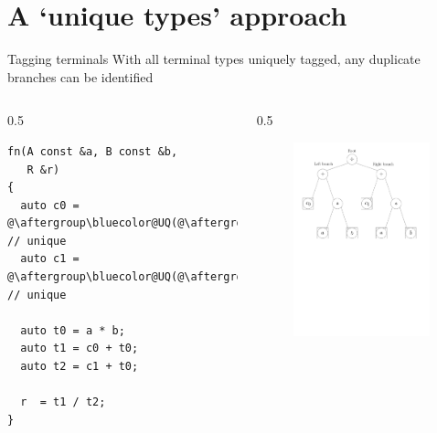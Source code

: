 \documentclass[xcolor=dvipsnames]{beamer}
\begin{document}
\section{A `unique types' approach}


\begin{frame}[fragile]{Tagging terminals}
With all terminal types uniquely tagged, any duplicate branches can be identified
  \begin{columns}[T] %
    \begin{column}{0.5\textwidth}
        \begin{lstlisting}
fn(A const &a, B const &b,
   R &r)
{
  auto c0 = @\aftergroup\bluecolor@UQ(@\aftergroup\blackcolor@7@\aftergroup\bluecolor@)@\aftergroup\blackcolor@; // unique
  auto c1 = @\aftergroup\bluecolor@UQ(@\aftergroup\blackcolor@9@\aftergroup\bluecolor@)@\aftergroup\blackcolor@; // unique

  auto t0 = a * b;
  auto t1 = c0 + t0;
  auto t2 = c1 + t0;

  r  = t1 / t2;
}
  \end{lstlisting}
    \end{column}%
    \hfill%
    \begin{column}{0.5\textwidth}
\begin{figure}[H]
 \centering
 \includegraphics[width=0.99\textwidth]{fig_exprtree}
\end{figure}
    \end{column}%
  \end{columns}
\end{frame}
\end{document}
